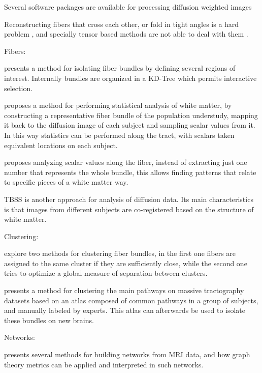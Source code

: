 Several software packages are available for processing diffusion weighted images \autocite{hasan_review_2011}

Reconstructing fibers that cross each other, or fold in tight angles is a hard problem \autocite{fillard_quantitative_2011}, and specially tensor based methods are not able to deal with them \autocite{tournier_diffusion_2011}.


Fibers:

\autocite{blaas_fast_2005} presents a method for isolating fiber bundles by defining several regions of interest. Internally bundles are organized in a KD-Tree which permits interactive selection.

\autocite{goodlett_group_2008} proposes a method for performing statistical analysis of white matter, by constructing a representative fiber bundle of the population understudy, mapping it back to the diffusion image of each subject and sampling scalar values from it. In this way statistics can be performed along the tract, with scalars taken equivalent locations on each subject.

\autocite{colby_along-tract_2011} proposes analyzing scalar values along the fiber, instead of extracting just one number that represents the whole bundle, this allows finding patterns that relate to specific pieces of a white matter way.

TBSS \autocite{smith_tract-based_2006} is another approach for analysis of diffusion data. Its main characteristics is that images from different subjects are co-registered based on the structure of white matter. 

Clustering:

\autocite{song_zhang_identifying_2008} explore two methods for clustering fiber bundles, in the first one fibers are assigned to the same cluster if they are sufficiently close, while the second one tries to optimize a global measure of separation between clusters.

\autocite{guevara_automatic_2012} presents a method for clustering the main pathways on massive tractography datasets based on an atlas composed of common pathways in a group of subjects, and manually labeled by experts. This atlas can afterwards be used to isolate these bundles on new brains.

Networks:

\autocite{rubinov_complex_2010} presents several methods for building networks from MRI data, and how graph theory metrics can be applied and interpreted in such networks.

